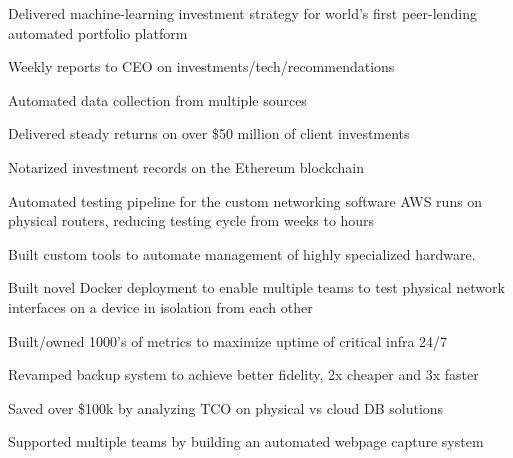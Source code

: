 \documentclass[]{resume}
\begin{document}
\begin{minipage}[t]{1.0\textwidth}
\begin{tightemize}
\item Delivered machine-learning investment strategy for world's first peer-lending automated portfolio platform
\item Weekly reports to CEO on investments/tech/recommendations
\item Automated data collection from multiple sources
\item Delivered steady returns on over \$50 million of client investments
\item Notarized investment records on the Ethereum blockchain
\end{tightemize}

\begin{tightemize}
\item Automated testing pipeline for the custom networking software AWS runs on physical routers, reducing testing cycle from weeks to hours
\item Built custom tools to automate management of highly specialized hardware.

\columnbreak

\item Built novel Docker deployment to enable multiple teams to test physical network interfaces on a device in isolation from each other
\end{tightemize}
\sectionsep
\end{minipage}

\begin{tightemize}
\item Built/owned 1000's of metrics to maximize uptime of critical infra 24/7
\item Revamped backup system to achieve better fidelity, 2x cheaper and 3x faster
\item Saved over \$100k by analyzing TCO on physical vs cloud DB solutions
\item Supported multiple teams by building an automated webpage capture system
\end{tightemize}
\end{document}
